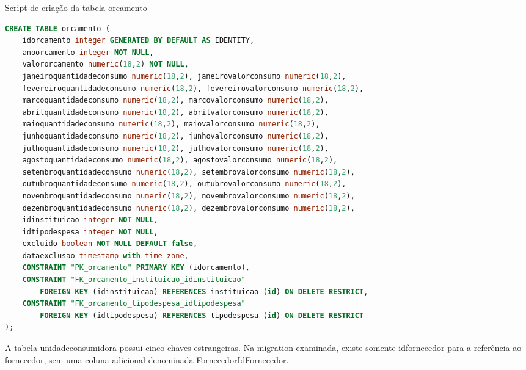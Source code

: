 \begin{quadro}[H]
\caption{Script de criação da tabela orcamento}\label{qua:bd-orcamento}
\begin{lstlisting}[language=SQL,breaklines=true,breakatwhitespace=false,frame=single,columns=fullflexible,basicstyle=\ttfamily\footnotesize]
CREATE TABLE orcamento (
    idorcamento integer GENERATED BY DEFAULT AS IDENTITY,
    anoorcamento integer NOT NULL,
    valororcamento numeric(18,2) NOT NULL,
    janeiroquantidadeconsumo numeric(18,2), janeirovalorconsumo numeric(18,2),
    fevereiroquantidadeconsumo numeric(18,2), fevereirovalorconsumo numeric(18,2),
    marcoquantidadeconsumo numeric(18,2), marcovalorconsumo numeric(18,2),
    abrilquantidadeconsumo numeric(18,2), abrilvalorconsumo numeric(18,2),
    maioquantidadeconsumo numeric(18,2), maiovalorconsumo numeric(18,2),
    junhoquantidadeconsumo numeric(18,2), junhovalorconsumo numeric(18,2),
    julhoquantidadeconsumo numeric(18,2), julhovalorconsumo numeric(18,2),
    agostoquantidadeconsumo numeric(18,2), agostovalorconsumo numeric(18,2),
    setembroquantidadeconsumo numeric(18,2), setembrovalorconsumo numeric(18,2),
    outubroquantidadeconsumo numeric(18,2), outubrovalorconsumo numeric(18,2),
    novembroquantidadeconsumo numeric(18,2), novembrovalorconsumo numeric(18,2),
    dezembroquantidadeconsumo numeric(18,2), dezembrovalorconsumo numeric(18,2),
    idinstituicao integer NOT NULL,
    idtipodespesa integer NOT NULL,
    excluido boolean NOT NULL DEFAULT false,
    dataexclusao timestamp with time zone,
    CONSTRAINT "PK_orcamento" PRIMARY KEY (idorcamento),
    CONSTRAINT "FK_orcamento_instituicao_idinstituicao"
        FOREIGN KEY (idinstituicao) REFERENCES instituicao (id) ON DELETE RESTRICT,
    CONSTRAINT "FK_orcamento_tipodespesa_idtipodespesa"
        FOREIGN KEY (idtipodespesa) REFERENCES tipodespesa (id) ON DELETE RESTRICT
);
\end{lstlisting}
\end{quadro}

A tabela unidadeconsumidora possui cinco chaves estrangeiras. Na migration examinada, existe somente idfornecedor para a referência ao fornecedor, sem uma coluna adicional denominada FornecedorIdFornecedor.

